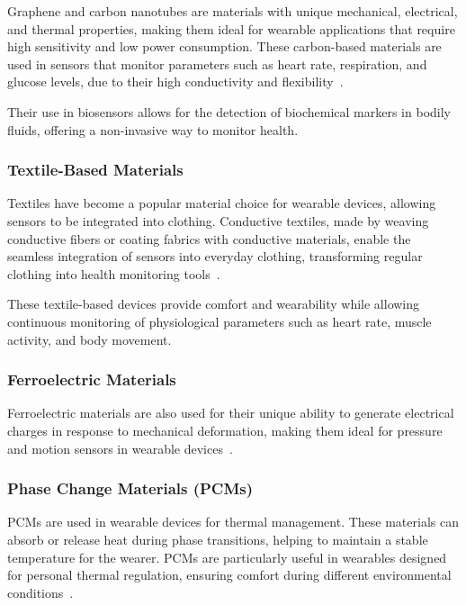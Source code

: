 \documentclass[journal]{IEEEtran}
\begin{document}
        Graphene and carbon nanotubes are materials with unique mechanical, electrical, and thermal properties, making them ideal for wearable applications that require high sensitivity and low power consumption. These carbon-based materials are used in sensors that monitor parameters such as heart rate, respiration, and glucose levels, due to their high conductivity and flexibility~\cite{Kim2017}.

        Their use in biosensors allows for the detection of biochemical markers in bodily fluids, offering a non-invasive way to monitor health.

        \subsubsection{Textile-Based Materials}

        Textiles have become a popular material choice for wearable devices, allowing sensors to be integrated into clothing. Conductive textiles, made by weaving conductive fibers or coating fabrics with conductive materials, enable the seamless integration of sensors into everyday clothing, transforming regular clothing into health monitoring tools~\cite{Song2024}.

        These textile-based devices provide comfort and wearability while allowing continuous monitoring of physiological parameters such as heart rate, muscle activity, and body movement.

        \subsubsection{Ferroelectric Materials}

         Ferroelectric materials are also used for their unique ability to generate electrical charges in response to mechanical deformation, making them ideal for pressure and motion sensors in wearable devices~\cite{Tsikriteas2021}.

        \subsubsection{Phase Change Materials (PCMs)}

        PCMs are used in wearable devices for thermal management. These materials can absorb or release heat during phase transitions, helping to maintain a stable temperature for the wearer. PCMs are particularly useful in wearables designed for personal thermal regulation, ensuring comfort during different environmental conditions~\cite{Yang2024}.
\end{document}
